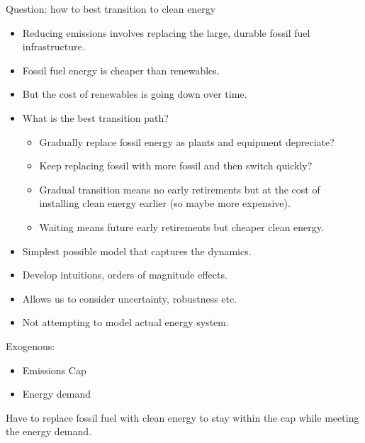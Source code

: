 \documentclass[singlespace]{easychithesis}
\begin{document}
Question: how to best transition to clean energy

\begin{itemize}
\item Reducing emissions involves replacing the large, durable fossil fuel
infrastructure.
\item Fossil fuel energy is cheaper than renewables.
\item But the cost of renewables is going down over time.
\item What is the best transition path?


\begin{itemize}
\item Gradually replace fossil energy as plants and equipment depreciate?
\item Keep replacing fossil with more fossil and then switch quickly?
\item Gradual transition means no early retirements but at the cost of
installing clean energy earlier (so maybe more expensive).
\item Waiting means future early retirements but cheaper clean energy.
\end{itemize}
\end{itemize}




\begin{itemize}
\item Simplest possible model that captures the dynamics.

\item Develop intuitions, orders of magnitude effects.

\item Allows us to consider uncertainty, robustness etc.

\item Not attempting to model actual energy system.
\end{itemize}



Exogenous:

	\begin{itemize}
    
    	\item{Emissions Cap}
        \item{Energy demand}

	\end{itemize}


Have to replace fossil fuel with clean energy to stay within the cap while meeting the energy demand.
\end{document}
